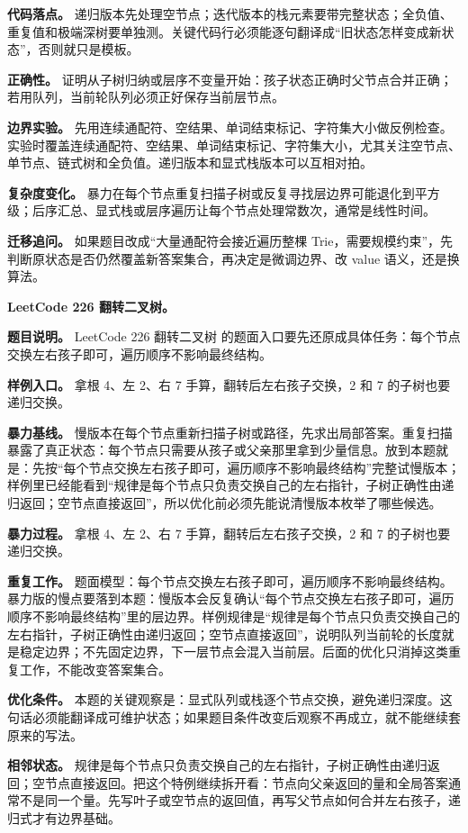 \textbf{代码落点。} 递归版本先处理空节点；迭代版本的栈元素要带完整状态；全负值、重复值和极端深树要单独测。关键代码行必须能逐句翻译成“旧状态怎样变成新状态”，否则就只是模板。

\textbf{正确性。} 证明从子树归纳或层序不变量开始：孩子状态正确时父节点合并正确；若用队列，当前轮队列必须正好保存当前层节点。

\textbf{边界实验。} 先用连续通配符、空结果、单词结束标记、字符集大小做反例检查。实验时覆盖连续通配符、空结果、单词结束标记、字符集大小，尤其关注空节点、单节点、链式树和全负值。递归版本和显式栈版本可以互相对拍。

\textbf{复杂度变化。} 暴力在每个节点重复扫描子树或反复寻找层边界可能退化到平方级；后序汇总、显式栈或层序遍历让每个节点处理常数次，通常是线性时间。

\textbf{迁移追问。} 如果题目改成“大量通配符会接近遍历整棵 Trie，需要规模约束”，先判断原状态是否仍然覆盖新答案集合，再决定是微调边界、改 value 语义，还是换算法。

\noindent\textbf{LeetCode 226 翻转二叉树。}

\textbf{题目说明。} LeetCode 226 翻转二叉树 的题面入口要先还原成具体任务：每个节点交换左右孩子即可，遍历顺序不影响最终结构。

\textbf{样例入口。} 拿根 4、左 2、右 7 手算，翻转后左右孩子交换，2 和 7 的子树也要递归交换。

\textbf{暴力基线。} 慢版本在每个节点重新扫描子树或路径，先求出局部答案。重复扫描暴露了真正状态：每个节点只需要从孩子或父亲那里拿到少量信息。放到本题就是：先按“每个节点交换左右孩子即可，遍历顺序不影响最终结构”完整试慢版本；样例里已经能看到“规律是每个节点只负责交换自己的左右指针，子树正确性由递归返回；空节点直接返回”，所以优化前必须先能说清慢版本枚举了哪些候选。

\textbf{暴力过程。} 拿根 4、左 2、右 7 手算，翻转后左右孩子交换，2 和 7 的子树也要递归交换。

\textbf{重复工作。} 题面模型：每个节点交换左右孩子即可，遍历顺序不影响最终结构。暴力版的慢点要落到本题：慢版本会反复确认“每个节点交换左右孩子即可，遍历顺序不影响最终结构”里的层边界。样例规律是“规律是每个节点只负责交换自己的左右指针，子树正确性由递归返回；空节点直接返回”，说明队列当前轮的长度就是稳定边界；不先固定边界，下一层节点会混入当前层。后面的优化只消掉这类重复工作，不能改变答案集合。

\textbf{优化条件。} 本题的关键观察是：显式队列或栈逐个节点交换，避免递归深度。这句话必须能翻译成可维护状态；如果题目条件改变后观察不再成立，就不能继续套原来的写法。

\textbf{相邻状态。} 规律是每个节点只负责交换自己的左右指针，子树正确性由递归返回；空节点直接返回。把这个特例继续拆开看：节点向父亲返回的量和全局答案通常不是同一个量。先写叶子或空节点的返回值，再写父节点如何合并左右孩子，递归式才有边界基础。

